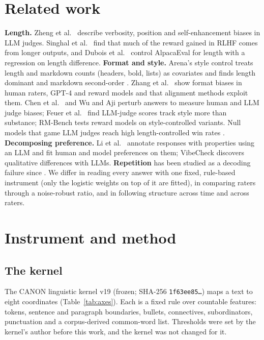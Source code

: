 \documentclass[11pt]{article}
\begin{document}
\section{Related work}
\textbf{Length.} Zheng et al.\ \cite{zheng} describe verbosity, position and self-enhancement biases in LLM judges. Singhal et al.\ \cite{singhal} find that much of the reward gained in RLHF comes from longer outputs, and Dubois et al.\ \cite{dubois} control AlpacaEval for length with a regression on length difference. \textbf{Format and style.} Arena's style control treats length and markdown counts (headers, bold, lists) as covariates and finds length dominant and markdown second-order \cite{stylecontrol}. Zhang et al.\ \cite{emojis} show format biases in human raters, GPT-4 and reward models and that alignment methods exploit them. Chen et al.\ \cite{humansllms} and Wu and Aji \cite{wuaji} perturb answers to measure human and LLM judge biases; Feuer et al.\ \cite{sos} find LLM-judge scores track style more than substance; RM-Bench \cite{rmbench} tests reward models on style-controlled variants. Null models that game LLM judges reach high length-controlled win rates \cite{cheating}. \textbf{Decomposing preference.} Li et al.\ \cite{dissecting} annotate responses with properties using an LLM and fit human and model preferences on them; VibeCheck \cite{vibecheck} discovers qualitative differences with LLMs. \textbf{Repetition} has been studied as a decoding failure since \cite{holtzman}. We differ in reading every answer with one fixed, rule-based instrument (only the logistic weights on top of it are fitted), in comparing raters through a noise-robust ratio, and in following structure across time and across raters.

\section{Instrument and method}
\subsection{The kernel}
The CANON linguistic kernel v19 (frozen; SHA-256 \texttt{1f63ee85\ldots}) maps a text to eight coordinates (Table~\ref{tab:axes}). Each is a fixed rule over countable features: tokens, sentence and paragraph boundaries, bullets, connectives, subordinators, punctuation and a corpus-derived common-word list. Thresholds were set by the kernel's author before this work, and the kernel was not changed for it.
\end{document}

